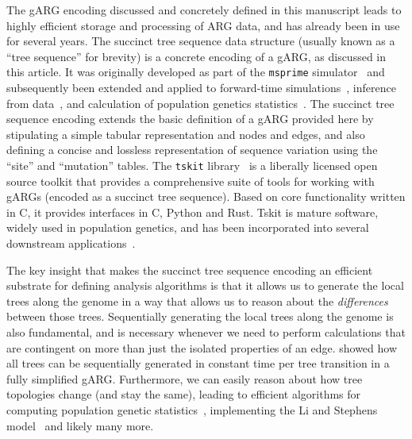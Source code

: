 \documentclass{article}
\begin{document}
The gARG encoding discussed and concretely defined in this manuscript
leads to highly efficient storage and processing of ARG data,
and has already been in use for several years.
The succinct tree sequence data structure (usually known as a ``tree sequence''
for brevity)
is a concrete encoding of a gARG, as discussed in this article.
It was originally developed as part of the \texttt{msprime}
simulator~\citep{kelleher2016efficient} and subsequently been
extended and applied to forward-time
simulations~\citep{kelleher2018efficient,haller2018tree},
inference from data~\citep{kelleher2019inferring,wohns2022unified},
and calculation of population genetics statistics~\citep{ralph2020efficiently}.
The succinct tree sequence encoding extends the basic definition
of a gARG provided here by stipulating a
simple tabular representation and nodes and edges,
and also defining a concise and lossless representation of
sequence variation using the ``site'' and  ``mutation'' tables.
The \texttt{tskit} library~\citep{tskit2023tskit} is a liberally
licensed open source toolkit that provides a comprehensive suite
of tools for working with gARGs (encoded as a succinct tree sequence).
Based on core functionality written
in C, it provides interfaces in C, Python and Rust.
Tskit is mature software, widely used in population genetics, and
has been incorporated into several downstream
applications~\citep[e.g.,][]{haller2019slim,speidel2019method,
adrion2020community,
terasaki2021geonomics,
baumdicker2021efficient,
fan2022genealogical,korfmann2022weak,
mahmoudi2022bayesian,petr2022slendr,rasmussen2022espalier,
zhang2023biobank,nowbandegani2023extremely}.

The key insight that makes the succinct tree sequence encoding
an efficient substrate for defining analysis algorithms is that
it allows us to generate the local trees along the genome
in a way that allows us to reason about the \emph{differences}
between those trees.
Sequentially generating the local trees along the genome
is also fundamental, and is necessary whenever we need to
perform calculations that are contingent on more than just the
isolated properties of an edge. \cite{kelleher2016efficient}
showed how all trees can be sequentially generated in
constant time per tree transition in a fully simplified gARG.
Furthermore, we can easily reason about how tree topologies
change (and stay the same), leading to efficient algorithms
for computing population genetic
statistics~\citep{kelleher2016efficient,ralph2020efficiently},
implementing the Li and Stephens
model~\citep{kelleher2019inferring,wohns2022unified}
and likely many more.
\end{document}
